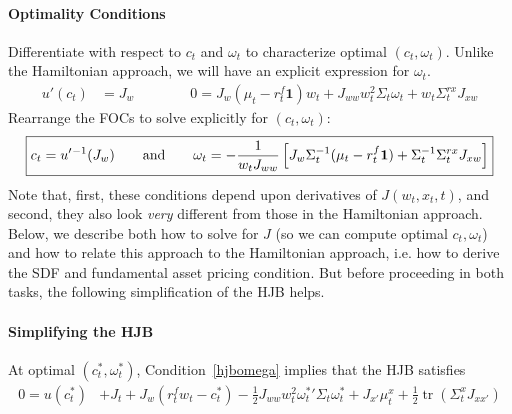 \documentclass[12pt]{article}
\theoremstyle{plain}
\theoremstyle{definition}
\theoremstyle{remark}
\newcommand{\trace}{\operatorname{tr}}
\begin{document}
\paragraph{Optimality Conditions}
Differentiate with respect to $c_t$ and $\omega_t$ to characterize
optimal $(c_t,\omega_t)$. Unlike the Hamiltonian approach, we will have
an explicit expression for $\omega_t$.
\begin{align}
  u'(c_t)
  &=
  J_w
  \qquad
  \qquad
  0
  =
  J_w (\mu_t-r_t^f\mathbf{1})w_t
  +
  J_{ww}
  w_t^2\Sigma_t\omega_t
  +
  w_t\Sigma_t^{rx}J_{xw}
  \label{hjbomega}
\end{align}
Rearrange the FOCs to solve explicitly for $(c_t,\omega_t)$:
\begin{align}
  \boxed{%
  c_t=u'{}^{-1}(J_w)
  \qquad \text{and}\qquad
  \omega_t
  =
  -
  \frac{1}{w_tJ_{ww}}
  \left[
  J_w
  \Sigma_t^{-1}
  (\mu_t - r^f_t\mathbf{1})
  +
  \Sigma_t^{-1}
  \Sigma_t^{rx}
  J_{xw}
  \right]
  }
  \label{hjbopt}
\end{align}
Note that, first, these conditions depend upon derivatives of
$J(w_t,x_t,t)$, and second, they also look \emph{very} different from
those in the Hamiltonian approach.
Below, we describe both how to solve for $J$ (so we can compute optimal
$c_t,\omega_t$) and how to relate this approach to the Hamiltonian
approach, i.e. how to derive the SDF and fundamental asset pricing
condition.
But before proceeding in both tasks, the following simplification of the
HJB helps.

\paragraph{Simplifying the HJB}
At optimal $(c_t^*,\omega_t^*)$, Condition~\ref{hjbomega} implies that the
HJB satisfies
\begin{align}
  0
  =
  u(c_t^*)
  &+
  J_t
  +
  J_{w}
  (r^f_tw_t -c_t^*)
  -
  \frac{1}{2}
  J_{ww}
  w_t^2
  \omega_{t}^*{}'
  \Sigma_t
  \omega_{t}^*
  +
  J_{x'}
  \mu_t^x
  +
  \frac{1}{2}
  \trace\left(
    \Sigma_t^x
    J_{xx'}
  \right)
  \label{hjbshort}
\end{align}
\end{document}
